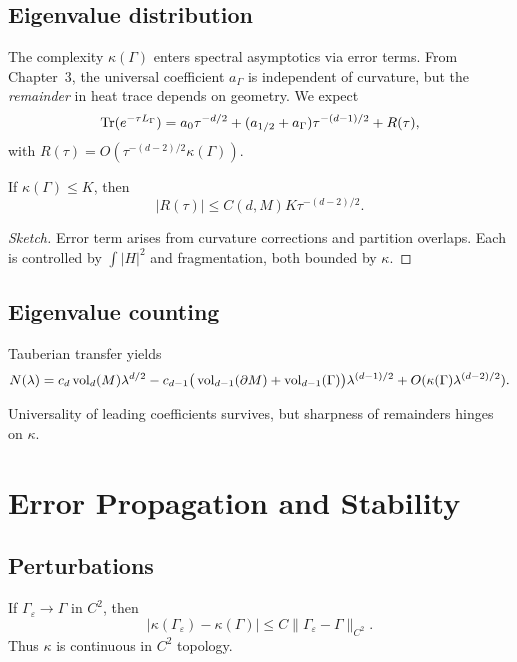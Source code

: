 \subsection{Eigenvalue distribution}
The complexity $\kappa(\Gamma)$ enters spectral asymptotics via error terms.
From Chapter~3, the universal coefficient $a_\Gamma$ is independent of curvature,
but the \emph{remainder} in heat trace depends on geometry.
We expect
\[
\operatorname{Tr}(e^{-\tau L_\Gamma}) = a_0\tau^{-d/2}+(a_{1/2}+a_\Gamma)\tau^{-(d-1)/2}+R(\tau),
\]
with $R(\tau)=O(\tau^{-(d-2)/2}\kappa(\Gamma))$.

\begin{proposition}
If $\kappa(\Gamma)\le K$, then
\[
|R(\tau)|\le C(d,M) K \tau^{-(d-2)/2}.
\]
\end{proposition}

\begin{proof}[Sketch]
Error term arises from curvature corrections and partition overlaps. Each is controlled by $\int |H|^2$ and fragmentation, both bounded by $\kappa$.
\end{proof}

\subsection{Eigenvalue counting}
Tauberian transfer yields
\[
N(\lambda)=c_d \operatorname{vol}_d(M)\lambda^{d/2}-c_{d-1}\big(\operatorname{vol}_{d-1}(\partial M)+\operatorname{vol}_{d-1}(\Gamma)\big)\lambda^{(d-1)/2}
+ O(\kappa(\Gamma)\lambda^{(d-2)/2}).
\]

\begin{remark}
Universality of leading coefficients survives, but sharpness of remainders hinges on $\kappa$.
\end{remark}

\section{Error Propagation and Stability}
\label{sec:error-propagation}

\subsection{Perturbations}
If $\Gamma_\varepsilon\to \Gamma$ in $C^2$, then
\[
|\kappa(\Gamma_\varepsilon)-\kappa(\Gamma)|\le C\|\Gamma_\varepsilon-\Gamma\|_{C^2}.
\]
Thus $\kappa$ is continuous in $C^2$ topology.


